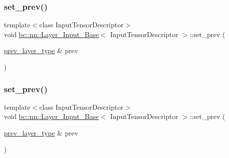 \mbox{\label{classbc_1_1nn_1_1Layer__Input__Base_a9d0dcc3e2d392e131642327942ede518}} 
\subsubsection{\texorpdfstring{set\+\_\+prev()}{set\_prev()}\hspace{0.1cm}{\footnotesize\ttfamily [1/2]}}
{\footnotesize\ttfamily template$<$class Input\+Tensor\+Descriptor$>$ \\
void \hyperlink{classbc_1_1nn_1_1Layer__Input__Base}{bc\+::nn\+::\+Layer\+\_\+\+Input\+\_\+\+Base}$<$ Input\+Tensor\+Descriptor $>$\+::set\+\_\+prev (\begin{DoxyParamCaption}\item[{\hyperlink{structbc_1_1nn_1_1Layer__Output__Base}{prev\+\_\+layer\+\_\+type} \&}]{prev }\end{DoxyParamCaption})\hspace{0.3cm}{\ttfamily [inline]}}

\mbox{\label{classbc_1_1nn_1_1Layer__Input__Base_a9d0dcc3e2d392e131642327942ede518}} 
\subsubsection{\texorpdfstring{set\+\_\+prev()}{set\_prev()}\hspace{0.1cm}{\footnotesize\ttfamily [2/2]}}
{\footnotesize\ttfamily template$<$class Input\+Tensor\+Descriptor$>$ \\
void \hyperlink{classbc_1_1nn_1_1Layer__Input__Base}{bc\+::nn\+::\+Layer\+\_\+\+Input\+\_\+\+Base}$<$ Input\+Tensor\+Descriptor $>$\+::set\+\_\+prev (\begin{DoxyParamCaption}\item[{\hyperlink{structbc_1_1nn_1_1Layer__Output__Base}{prev\+\_\+layer\+\_\+type} \&}]{prev }\end{DoxyParamCaption})\hspace{0.3cm}{\ttfamily [inline]}}



